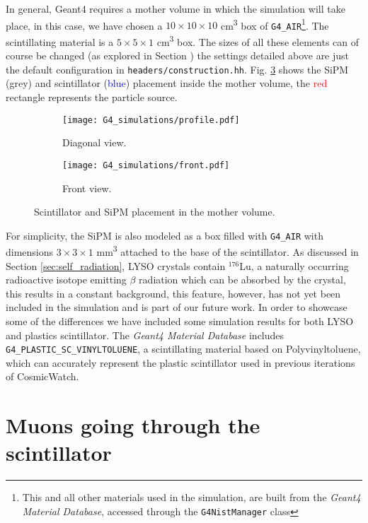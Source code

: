 In general, Geant4 requires a mother volume in which the simulation will take place, in this case, we have chosen a $10\times10\times10$ \unit{\cm\cubed} box of \texttt{G4\_AIR}\footnote{This and all other materials used in the simulation, are built from the \textit{Geant4 Material Database}, accessed through the \texttt{G4NistManager} class}. The scintillating material is a $5\times5\times1$ \unit{\cm\cubed} box. The sizes of all these elements can of course be changed (as explored in Section ) the settings detailed above are just the default configuration in \texttt{headers/construction.hh}. Fig. \ref{fig:geometry} shows the SiPM (grey) and scintillator (\textcolor{blue}{blue}) placement inside the mother volume, the \textcolor{red}{red} rectangle represents the particle source.

\begin{figure}[H]
  \centering
  \begin{subfigure}[t]{0.48\textwidth}
    \texttt{[image: G4\_simulations/profile.pdf]}
    \caption{\label{sfig:geometry_profile}Diagonal view.}
  \end{subfigure}
  \hfill
  \begin{subfigure}[t]{0.48\textwidth}
    \texttt{[image: G4\_simulations/front.pdf]}
    \caption{\label{sfig:geometry_front}Front view.}
  \end{subfigure}
  \caption{\label{fig:geometry}Scintillator and SiPM placement in the mother volume.}
\end{figure}

For simplicity, the SiPM is also modeled as a box filled with \texttt{G4\_AIR} with dimensions $3\times3\times1$ \unit{\mm\cubed} attached to the base of the scintillator. As discussed in Section \ref{sec:self_radiation}, LYSO crystals contain $^{176}$Lu, a naturally occurring radioactive isotope emitting $\beta$ radiation which can be absorbed by the crystal, this results in a constant background, this feature, however, has not yet been included in the simulation and is part of our future work. In order to showcase some of the differences we have included some simulation results for both LYSO and plastics scintillator. The \textit{Geant4 Material Database} includes \texttt{G4\_PLASTIC\_SC\_VINYLTOLUENE}, a scintillating material based on Polyvinyltoluene, which can accurately represent the plastic scintillator used in previous iterations of CosmicWatch.

\section{Muons going through the scintillator}

